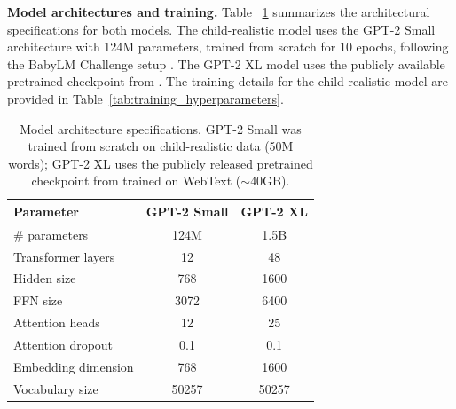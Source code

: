 \noindent \textbf{Model architectures and training.} Table ~\ref{tab:model_architecture} summarizes the architectural specifications for both models. The child-realistic model uses the GPT-2 Small architecture with 124M parameters, trained from scratch for 10 epochs, following the BabyLM Challenge setup \citep{hu2024findings}. The GPT-2 XL model uses the publicly available pretrained checkpoint from \citet{radford2019language}. The training details for the child-realistic model are provided in Table~\ref{tab:training_hyperparameters}.

\begin{table}[ht]
\centering
\small
\vspace{8pt}
\caption{Model architecture specifications. GPT-2 Small was trained from scratch on child-realistic data (50M words); GPT-2 XL uses the publicly released pretrained checkpoint from \citet{radford2019language} trained on WebText ($\sim$40GB).}
\label{tab:model_architecture}
\setlength{\tabcolsep}{4pt}
\renewcommand{\arraystretch}{1.1}
\begin{tabular}{@{}lcc@{}}
\toprule
\textbf{Parameter} & \textbf{GPT-2 Small} & \textbf{GPT-2 XL} \\
\midrule
\# parameters       & 124M  & 1.5B  \\
Transformer layers  & 12    & 48    \\
Hidden size         & 768   & 1600  \\
FFN size            & 3072  & 6400  \\
Attention heads     & 12    & 25    \\
Attention dropout   & 0.1  & 0.1   \\
Embedding dimension & 768   & 1600  \\
Vocabulary size     & 50257 & 50257 \\
\bottomrule
\end{tabular}
\end{table}

